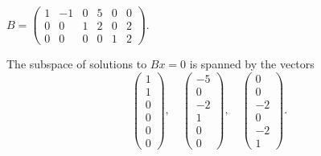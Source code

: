 \documentclass{ximera}
\begin{document}
\begin{exercise} \label{c5.2.2d}
$B = \left(\begin{array}{rrrrrr} 1 & -1 & 0 & 5 & 0 & 0\\
        0 & 0 & 1 & 2 & 0 & 2\\
        0 & 0 & 0 & 0 & 1 & 2\end{array}\right)$.

\begin{solution}

\ans The subspace of solutions to $Bx = 0$ is spanned by the vectors
\[
\left(\begin{array}{r} 1 \\ 1 \\ 0 \\ 0 \\ 0 \\ 0 \end{array}\right), \quad
\left(\begin{array}{r} -5 \\ 0 \\ -2 \\ 1 \\ 0 \\ 0 \end{array}\right), \quad
\left(\begin{array}{r} 0 \\ 0 \\ -2 \\ 0 \\ -2 \\ 1 \end{array}\right).
\]


\end{solution}
\end{exercise}
\end{document}

